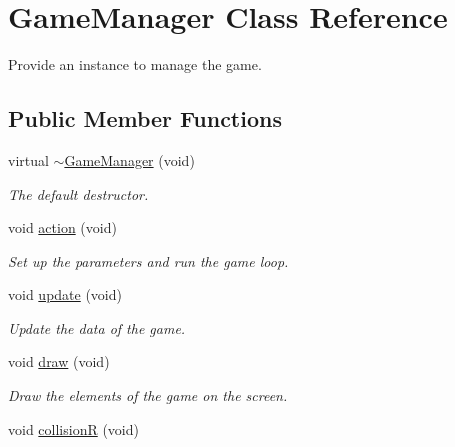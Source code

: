 \hypertarget{class_game_manager}{\section{Game\-Manager Class Reference}
\label{class_game_manager}
}


Provide an instance to manage the game.  


\subsection*{Public Member Functions}
\begin{DoxyCompactItemize}
\item 
\hypertarget{class_game_manager_acdc9d0af34329c0a5bf6f0949727a413}{virtual \hyperlink{class_game_manager_acdc9d0af34329c0a5bf6f0949727a413}{$\sim$\-Game\-Manager} (void)}\label{class_game_manager_acdc9d0af34329c0a5bf6f0949727a413}

\begin{DoxyCompactList}\small\item\em The default destructor. \end{DoxyCompactList}\item 
\hypertarget{class_game_manager_a30c2267cebe64ca70ec49c8560ceaf70}{void \hyperlink{class_game_manager_a30c2267cebe64ca70ec49c8560ceaf70}{action} (void)}\label{class_game_manager_a30c2267cebe64ca70ec49c8560ceaf70}

\begin{DoxyCompactList}\small\item\em Set up the parameters and run the game loop. \end{DoxyCompactList}\item 
\hypertarget{class_game_manager_a503f08e6803a70c65c324a88078da558}{void \hyperlink{class_game_manager_a503f08e6803a70c65c324a88078da558}{update} (void)}\label{class_game_manager_a503f08e6803a70c65c324a88078da558}

\begin{DoxyCompactList}\small\item\em Update the data of the game. \end{DoxyCompactList}\item 
\hypertarget{class_game_manager_acaf23b5999e093f95350b377930709f2}{void \hyperlink{class_game_manager_acaf23b5999e093f95350b377930709f2}{draw} (void)}\label{class_game_manager_acaf23b5999e093f95350b377930709f2}

\begin{DoxyCompactList}\small\item\em Draw the elements of the game on the screen. \end{DoxyCompactList}\item 
\hypertarget{class_game_manager_afc42f60e3bc2b27d2c1c97db4f0d0f5d}{void \hyperlink{class_game_manager_afc42f60e3bc2b27d2c1c97db4f0d0f5d}{collision\-R} (void)}\label{class_game_manager_afc42f60e3bc2b27d2c1c97db4f0d0f5d}


\end{DoxyCompactItemize}
